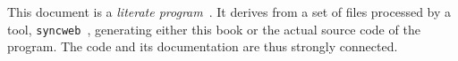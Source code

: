 
This document is a {\em literate program}~\cite{lp-book}. 
It derives from a set of files processed by a tool,
{\tt syncweb}~\cite{syncweb}, generating either
this book or the actual source code of the program. The code and
its documentation are thus strongly connected.








